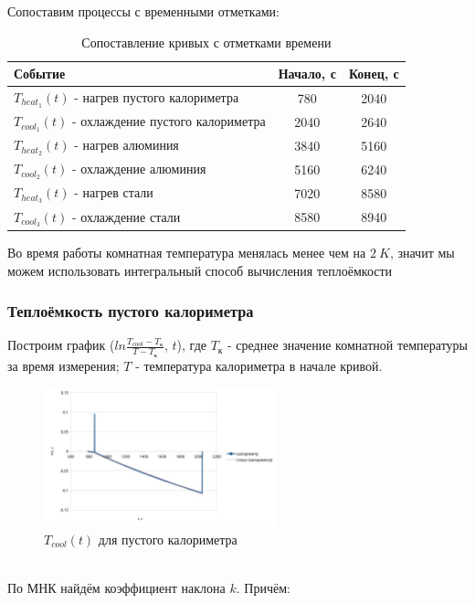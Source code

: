\documentclass[a4paper]{article}
\begin{document}
    Сопоставим процессы с временными отметками:

    \begin{table}[!ht]
        \centering
        \begin{tabular}{|l|c|c|}
            \hline
            Событие & Начало, с & Конец, с\\ \hline
            $T_{heat_1}(t)$ - нагрев пустого калориметра & 780 & 2040\\ \hline
            $T_{cool_1}(t)$ - охлаждение пустого калориметра & 2040 & 2640\\ \hline
            $T_{heat_2}(t)$ - нагрев алюминия & 3840 & 5160\\ \hline
            $T_{cool_2}(t)$ - охлаждение алюминия & 5160 & 6240\\ \hline
            $T_{heat_3}(t)$ - нагрев стали & 7020 & 8580\\ \hline
            $T_{cool_3}(t)$ - охлаждение стали & 8580 & 8940\\ \hline

        \end{tabular}
        \caption{Сопоставление кривых с отметками времени}
        \label{tab:timetable}
    \end{table}

    Во время работы комнатная температура менялась менее чем на $2~K$, значит мы можем использовать интегральный способ вычисления теплоёмкости

   \subsubsection{Теплоёмкость пустого калориметра}

        Построим график ($ln \frac{T_{cool} - T_\text{к}}{T - T_\text{к}}$, $t$), где $T_\text{к}$ - среднее значение комнатной температуры за время измерения; $T$ - температура калориметра в начале кривой. \\
        \begin{figure}[ht]
            \centering
            \includegraphics[width=0.6\textwidth]{калориметр.jpg}
            \caption{$T_{cool}(t)$ для пустого калориметра}
            \label{plot:T_cool_1}
        \end{figure}
        \\
        По МНК найдём коэффициент наклона $k$. Причём: \\
\end{document}
